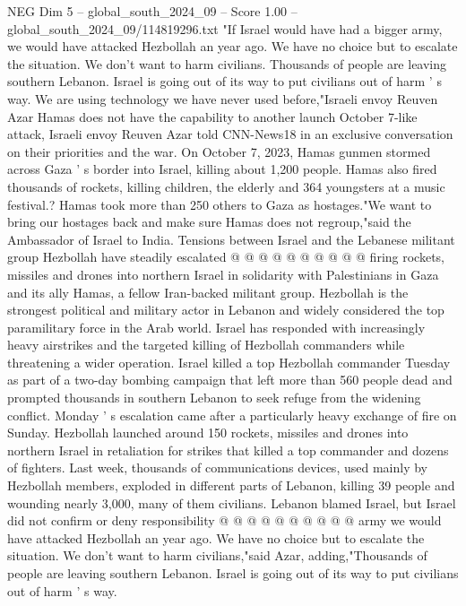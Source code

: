 \begin{textsample}{NEG Dim 5 – global\_south\_2024\_09 – Score 1.00 – global\_south\_2024\_09/114819296.txt}  \label{ex:f5_neg_199}
"If Israel would have had a bigger army, we would have attacked Hezbollah an year ago.
We have no choice but to escalate the situation.
We don't want to harm civilians.
Thousands of people are leaving southern Lebanon.
Israel is going out of its way to put civilians out of harm ' s way.
We are using technology we have never used before,"Israeli envoy Reuven Azar Hamas does not have the capability to another launch October 7-like attack, Israeli envoy Reuven Azar told CNN-News18 in an exclusive conversation on their priorities and the war.
On October 7, 2023, Hamas gunmen stormed across Gaza ' s border into Israel, killing about 1,200 people.
Hamas also fired thousands of rockets, killing children, the elderly and 364 youngsters at a music festival.?
Hamas took more than 250 others to Gaza as hostages."We want to bring our hostages back and make sure Hamas does not regroup,"said the Ambassador of Israel to India.
Tensions between Israel and the Lebanese militant group Hezbollah have steadily escalated @ @ @ @ @ @ @ @ @ @ firing rockets, missiles and drones into northern Israel in solidarity with Palestinians in Gaza and its ally Hamas, a fellow Iran-backed militant group.
Hezbollah is the strongest political and military actor in Lebanon and widely considered the top paramilitary force in the Arab world.
Israel has responded with increasingly heavy airstrikes and the targeted killing of Hezbollah commanders while threatening a wider operation.
Israel killed a top Hezbollah commander Tuesday as part of a two-day bombing campaign that left more than 560 people dead and prompted thousands in southern Lebanon to seek refuge from the widening conflict.
Monday ' s escalation came after a particularly heavy exchange of fire on Sunday.
Hezbollah launched around 150 rockets, missiles and drones into northern Israel in retaliation for strikes that killed a top commander and dozens of fighters.
Last week, thousands of communications devices, used mainly by Hezbollah members, exploded in different parts of Lebanon, killing 39 people and wounding nearly 3,000, many of them civilians.
Lebanon blamed Israel, but Israel did not confirm or deny responsibility @ @ @ @ @ @ @ @ @ @ army we would have attacked Hezbollah an year ago.
We have no choice but to escalate the situation.
We don't want to harm civilians,"said Azar, adding,"Thousands of people are leaving southern Lebanon.
Israel is going out of its way to put civilians out of harm ' s way.

\end{textsample}
